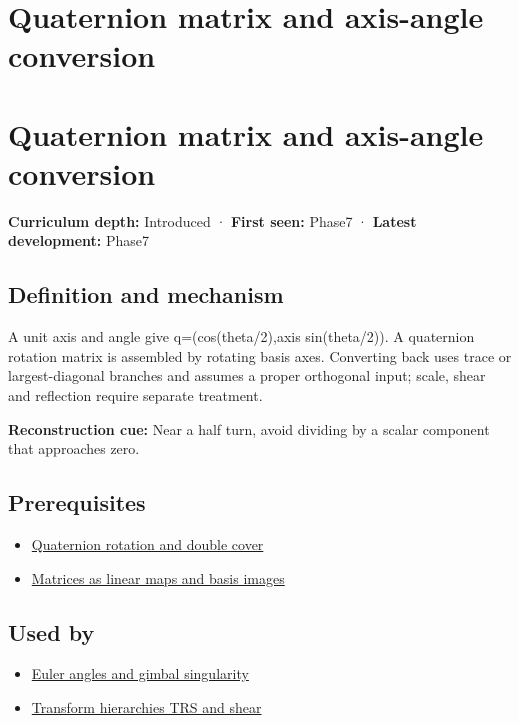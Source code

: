 \hypertarget{appendix-26d8da71f6c4}{}
\section*{Quaternion matrix and axis-angle conversion}
\section{Quaternion matrix and axis-angle conversion}\label{quaternion-matrix-and-axis-angle-conversion}

\textbf{Curriculum depth:} Introduced · \textbf{First seen:} Phase7 · \textbf{Latest development:} Phase7

\subsection{Definition and mechanism}\label{definition-and-mechanism}

A unit axis and angle give q=(cos(theta/2),axis sin(theta/2)). A quaternion rotation matrix is assembled by rotating basis axes. Converting back uses trace or largest-diagonal branches and assumes a proper orthogonal input; scale, shear and reflection require separate treatment.

\textbf{Reconstruction cue:} Near a half turn, avoid dividing by a scalar component that approaches zero.

\subsection{Prerequisites}\label{prerequisites}

\begin{itemize}
\tightlist
\item
  \hyperref[appendix-8e61ab68f6b2]{Quaternion rotation and double cover}
\item
  \hyperref[appendix-bd39c3bf5d64]{Matrices as linear maps and basis images}
\end{itemize}

\subsection{Used by}\label{used-by}

\begin{itemize}
\tightlist
\item
  \hyperref[appendix-5f723fbd0593]{Euler angles and gimbal singularity}
\item
  \hyperref[appendix-292c061cd47c]{Transform hierarchies TRS and shear}
\end{itemize}

